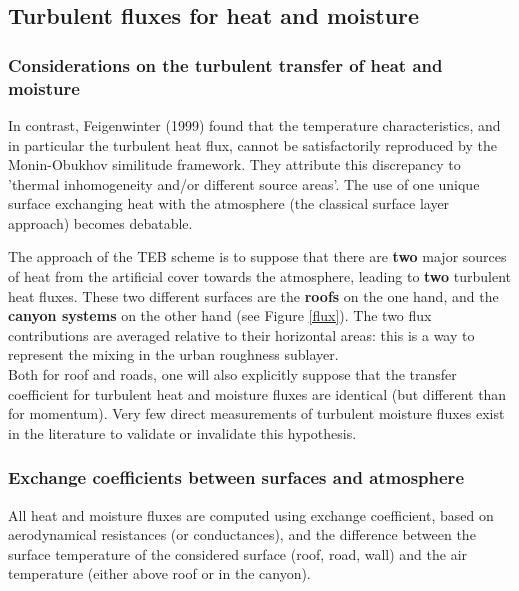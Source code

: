\subsection{Turbulent fluxes for heat and moisture}\label{turb}

\subsubsection{Considerations on the turbulent transfer of heat and moisture}

In contrast, Feigenwinter \etal (1999) found that the temperature
characteristics, and in particular the turbulent heat flux, cannot be
satisfactorily reproduced by the Monin-Obukhov similitude framework.
They attribute this discrepancy to 'thermal inhomogeneity and/or
different source areas'. The use of one unique surface exchanging heat
with the atmosphere (the classical surface layer approach) becomes
debatable.

The approach of the TEB scheme is to suppose that there are {\bf two}
major sources of heat from the artificial cover
towards the atmosphere, leading to {\bf two}
turbulent heat fluxes. These two different surfaces are the
{\bf roofs} on the one hand,
and the {\bf canyon systems} on the other hand (see Figure \ref{flux}).
The two flux contributions are averaged relative to their horizontal
areas: this is a way to represent the mixing in the urban roughness
sublayer.\\


Both for roof and roads, one will also explicitly
suppose that the transfer coefficient for turbulent
heat and moisture fluxes are identical (but different than for momentum).
Very few direct measurements of turbulent moisture fluxes exist
in the literature to validate or invalidate this hypothesis.

\subsubsection{Exchange coefficients between surfaces and atmosphere}

All heat and moisture fluxes are computed using exchange coefficient, based on aerodynamical resistances (or conductances), and the difference between the surface temperature of the considered surface (roof, road, wall) and the air temperature (either above roof or in the canyon). \\

